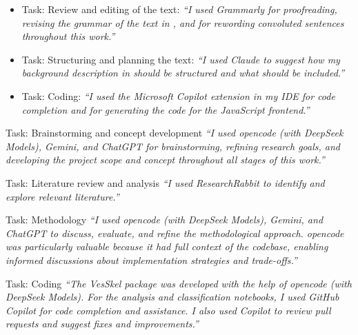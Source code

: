 \documentclass[11pt]{article}
\begin{document}
\begin{itemize}
  \item Task: Review and editing of the text: \textit{``I used
      Grammarly for proofreading, revising the grammar of the text in
      , and for rewording
    convoluted sentences throughout this work.''}
  \item Task: Structuring and planning the text: \textit{``I used
      Claude to suggest how my background description in
     should be structured and what should be included.''}
  \item Task: Coding: \textit{``I used the Microsoft Copilot
      extension in my IDE for code completion and for generating the
    code for the JavaScript frontend.''}
\end{itemize}

\vspace{.25em}

\begin{answerbox}{Task: Brainstorming and concept development}
  \textit{``I used opencode (with DeepSeek Models), Gemini, and ChatGPT for
    brainstorming, refining research goals, and developing the project
  scope and concept throughout all stages of this work.''}
\end{answerbox}

\vspace{.25em}

\begin{answerbox}{Task: Literature review and analysis}
  \textit{``I used ResearchRabbit to identify and explore relevant
  literature.''}
\end{answerbox}

\vspace{.25em}

\begin{answerbox}{Task: Methodology}
  \textit{``I used opencode (with DeepSeek Models), Gemini, and ChatGPT
    to discuss, evaluate, and refine the methodological approach.
    opencode was particularly valuable because it had full context of the
    codebase, enabling informed discussions about implementation
  strategies and trade-offs.''}
\end{answerbox}

\vspace{.25em}

\begin{answerbox}{Task: Coding}
  \textit{``The VesSkel package was developed with the help of opencode
    (with DeepSeek Models). For the analysis and classification
    notebooks, I used GitHub Copilot for code completion and assistance.
    I also used Copilot to review pull requests and suggest fixes and
  improvements.''}
\end{answerbox}
\end{document}
